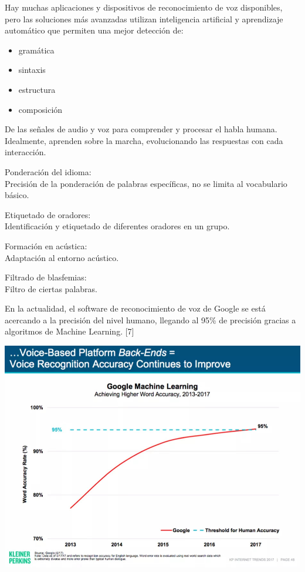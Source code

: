 \documentclass[twocolumn]{article}
\begin{document}
Hay muchas aplicaciones y dispositivos de reconocimiento de voz disponibles, pero las soluciones más avanzadas utilizan inteligencia artificial y aprendizaje automático que permiten una mejor detección de:

\begin{itemize}
  \item gramática
  \item sintaxis
  \item estructura
  \item composición
\end{itemize}

De las señales de audio y voz para comprender y procesar el habla humana. Idealmente, aprenden sobre la marcha, evolucionando las respuestas con cada interacción.

\begin{description}
  \item Ponderación del idioma: \\
        Precisión de la ponderación de palabras específicas, no se limita al vocabulario básico.
  \item Etiquetado de oradores: \\
        Identificación y etiquetado de diferentes oradores en un grupo.
  \item Formación en acústica: \\
        Adaptación al entorno acústico.
  \item Filtrado de blasfemias: \\
        Filtro de ciertas palabras.
\end{description}

En la actualidad, el software de reconocimiento de voz de Google se está acercando a la precisión del nivel humano, llegando al 95\% de precisión gracias a algoritmos de Machine Learning. [7]

\includegraphics[width=1.02\linewidth]{img/aagyw-j4rrq.jpg}
\end{document}
